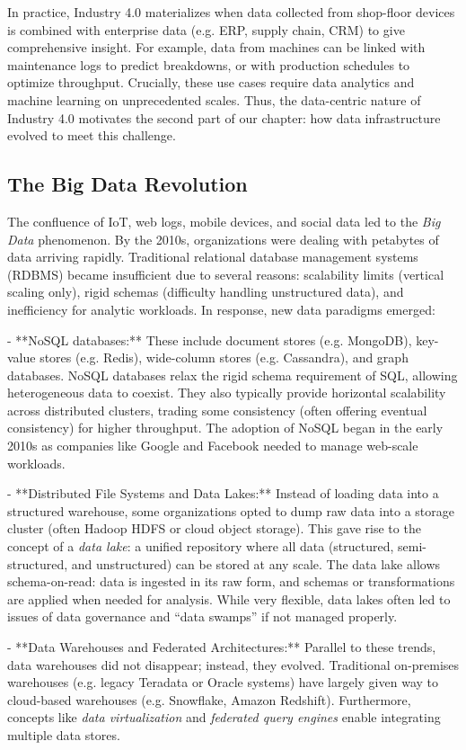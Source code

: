 In practice, Industry 4.0 materializes when data collected from shop-floor devices is combined with enterprise data (e.g. ERP, supply chain, CRM) to give comprehensive insight. For example, data from machines can be linked with maintenance logs to predict breakdowns, or with production schedules to optimize throughput. Crucially, these use cases require data analytics and machine learning on unprecedented scales. Thus, the data-centric nature of Industry 4.0 motivates the second part of our chapter: how data infrastructure evolved to meet this challenge.

\subsection{The Big Data Revolution}
The confluence of IoT, web logs, mobile devices, and social data led to the \emph{Big Data} phenomenon. By the 2010s, organizations were dealing with petabytes of data arriving rapidly. Traditional relational database management systems (RDBMS) became insufficient due to several reasons: scalability limits (vertical scaling only), rigid schemas (difficulty handling unstructured data), and inefficiency for analytic workloads. In response, new data paradigms emerged:

- **NoSQL databases:** These include document stores (e.g. MongoDB), key-value stores (e.g. Redis), wide-column stores (e.g. Cassandra), and graph databases. NoSQL databases relax the rigid schema requirement of SQL, allowing heterogeneous data to coexist. They also typically provide horizontal scalability across distributed clusters, trading some consistency (often offering eventual consistency) for higher throughput. The adoption of NoSQL began in the early 2010s as companies like Google and Facebook needed to manage web-scale workloads.

- **Distributed File Systems and Data Lakes:** Instead of loading data into a structured warehouse, some organizations opted to dump raw data into a storage cluster (often Hadoop HDFS or cloud object storage). This gave rise to the concept of a \emph{data lake}: a unified repository where all data (structured, semi-structured, and unstructured) can be stored at any scale. The data lake allows schema-on-read: data is ingested in its raw form, and schemas or transformations are applied when needed for analysis. While very flexible, data lakes often led to issues of data governance and “data swamps” if not managed properly.

- **Data Warehouses and Federated Architectures:** Parallel to these trends, data warehouses did not disappear; instead, they evolved. Traditional on-premises warehouses (e.g. legacy Teradata or Oracle systems) have largely given way to cloud-based warehouses (e.g. Snowflake, Amazon Redshift). Furthermore, concepts like \emph{data virtualization} and \emph{federated query engines} enable integrating multiple data stores.

